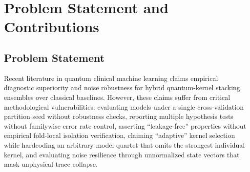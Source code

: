 \documentclass[journal,twocolumn]{IEEEtran}
\begin{document}
\section{Problem Statement and Contributions}

\subsection{Problem Statement}
Recent literature in quantum clinical machine learning claims empirical diagnostic superiority and noise robustness for hybrid quantum-kernel stacking ensembles over classical baselines. However, these claims suffer from critical methodological vulnerabilities: evaluating models under a single cross-validation partition seed without robustness checks, reporting multiple hypothesis tests without familywise error rate control, asserting ``leakage-free'' properties without empirical fold-local isolation verification, claiming ``adaptive'' kernel selection while hardcoding an arbitrary model quartet that omits the strongest individual kernel, and evaluating noise resilience through unnormalized state vectors that mask unphysical trace collapse.
\end{document}
